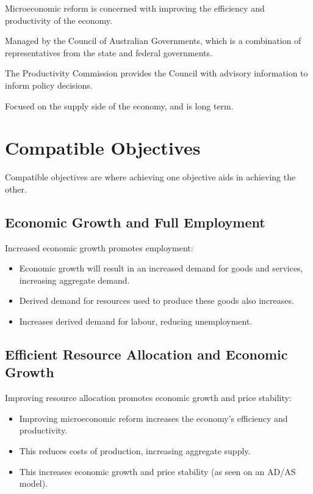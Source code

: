 \documentclass[a4paper,11pt]{article}
\begin{document}
Microeconomic reform is concerned with improving the efficiency and productivity
of the economy.

Managed by the Council of Australian Governments, which is a combination of
representatives from the state and federal governments.

The Productivity Commission provides the Council with advisory information to
inform policy decisions.

Focused on the supply side of the economy, and is long term.




\section{Compatible Objectives}

Compatible objectives are where achieving one objective aids in achieving the
other.


\subsection{Economic Growth and Full Employment}

Increased economic growth promotes employment:

\begin{itemize}
\item Economic growth will result in an increased demand for goods and services,
	increasing aggregate demand.
\item Derived demand for resources used to produce these goods also increases.
\item Increases derived demand for labour, reducing unemployment.
\end{itemize}


\subsection{Efficient Resource Allocation and Economic Growth}

Improving resource allocation promotes economic growth and price stability:

\begin{itemize}
\item Improving microeconomic reform increases the economy's efficiency and
	productivity.
\item This reduces costs of production, increasing aggregate supply.
\item This increases economic growth and price stability (as seen on an AD/AS
	model).
\end{itemize}
\end{document}
